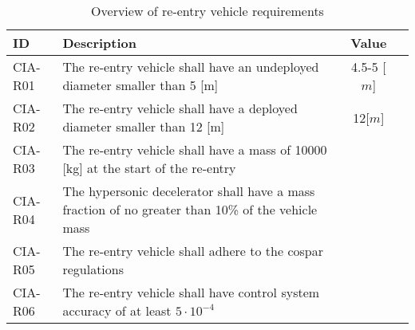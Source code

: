 \begin{table}[h]
	\caption{Overview of re-entry vehicle requirements} 
	\begin{tabular}{|p{}|p{}|c|c|}
	    \hline
	    ID          & Description   & Value &                                                                                           \\ \hline \hline
	CIA-R01 & The re-entry vehicle shall have an undeployed diameter smaller than 5 [m]                   & 4.5-5 [$m$]  & \cmark     				            \\ \hline
	CIA-R02 & The re-entry vehicle shall have a deployed diameter smaller than 12 [m]                     & 12[$m$] &  \cmark 				            \\ \hline	
	CIA-R03 & The re-entry vehicle shall have a mass of 10000 [kg] at the start of the re-entry           &  &  \cmark          				            \\ \hline
	CIA-R04 & The hypersonic decelerator shall have a mass fraction of no greater than 10\% of the vehicle mass	&  & \cmark \\ \hline 
	CIA-R05 &  The re-entry vehicle shall adhere to the \gls{cospar} regulations  & & \cmark \\ \hline
	CIA-R06 &  The re-entry vehicle shall have control system accuracy of at least $5\cdot 10^{-4}$ & & \cmark \\ \hline
    \end{tabular}
\end{table}















